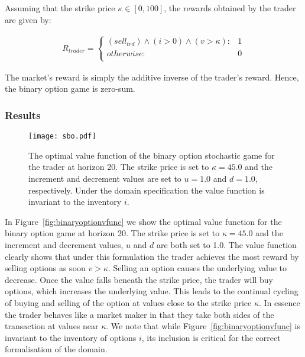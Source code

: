 Assuming that the strike price $\kappa \in [0, 100]$, the rewards obtained by the trader are given by:

{\small 
\abovedisplayskip=0pt
\belowdisplayskip=0pt
\begin{align*}
  R_{trader} = 
    \begin{cases}
      (sell_{trd}) \wedge (i > 0) \wedge (v > \kappa) : & 1 \\ 
      otherwise : & 0 \\
    \end{cases} \nonumber
\end{align*}
}%

The market's reward is simply the additive inverse of the trader's 
reward. Hence, the binary option game is zero-sum. 

\subsubsection{Results}

\begin{figure}[h!]
\texttt{[image: sbo.pdf]}
\caption{The optimal value function of the binary option stochastic game for the trader at horizon 20. 
The strike price is set to $\kappa = 45.0$ and the increment and
decrement values are set to $u = 1.0$ and $d = 1.0$, respectively. Under the domain specification
the value function is invariant to the inventory $i$. }
\label{fig:binaryoptionvfunc}
\end{figure}

In Figure~\eqref{fig:binaryoptionvfunc} we show the optimal value function for the
binary option game at horizon 20. The strike price is set to $\kappa = 45.0$ and
the increment and decrement values, $u$ and $d$ are both set to 1.0. The
value function clearly shows that under this formulation the trader
achieves the most reward by selling options as soon $v > \kappa$.
Selling an option causes the underlying value to decrease. Once the value
falls beneath the strike price, the trader will buy options, which increases
the underlying value. This leads to the continual cycling of buying and selling 
of the option at values close to the strike price $\kappa$. In essence the trader 
behaves like a market maker in that they take both sides of the transaction at values near 
$\kappa$. We note that while Figure~\eqref{fig:binaryoptionvfunc} is invariant to the inventory
of options $i$, its inclusion is critical for the correct formalisation of the domain.

